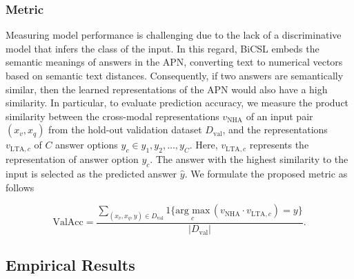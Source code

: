 \documentclass[letterpaper]{article} %
\begin{document}
\subsubsection{Metric}
Measuring model performance is challenging due to the lack of a discriminative model that infers the class of the input. In this regard, BiCSL embeds the semantic meanings of answers in the APN, converting text to numerical vectors based on semantic text distances. Consequently, if two answers are semantically similar, then the learned representations of the APN would also have a high similarity. In particular, to evaluate prediction accuracy, we measure the product similarity between the cross-modal representations $v_{\text{NHA}}$ of an input pair $(x_v, x_q)$ from the hold-out validation dataset $D_{\text{val}}$, and the representations $v_{\text{LTA},c}$ of $C$ answer options $y_c \in {y_1, y_2, \dots, y_C}$. Here, $v_{\text{LTA},c}$ represents the representation of answer option $y_c$. The answer with the highest similarity to the input is selected as the predicted answer $\hat{y}$. We formulate the proposed metric as follows 

\begin{equation}
    \mbox{ValAcc} = \frac{\sum_{ (x_v,x_q,y)\in D_{\text{val}}}   {1}\{ \underset{c}{\mbox{arg max}}\,(v_{\text{NHA}}\cdot v_{\text{LTA},c})  = y   \}    }{  |D_{\text{val}}| }.
    \label{eq:acc}
\end{equation}


\subsection{Empirical Results}
\end{document}
